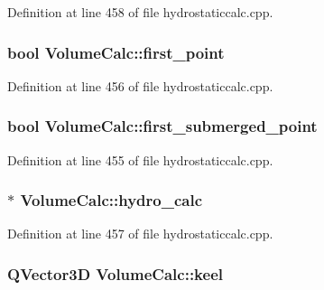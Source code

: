 Definition at line 458 of file hydrostaticcalc.\-cpp.

\hypertarget{structVolumeCalc_ab639da79639aeb33b3aaeb429283f8ca}{
\subsubsection[{first\-\_\-point}]{\setlength{\rightskip}{0pt plus 5cm}bool Volume\-Calc\-::first\-\_\-point}}\label{structVolumeCalc_ab639da79639aeb33b3aaeb429283f8ca}


Definition at line 456 of file hydrostaticcalc.\-cpp.

\hypertarget{structVolumeCalc_a3bc27914e09f86d93cb28daad90dddc1}{
\subsubsection[{first\-\_\-submerged\-\_\-point}]{\setlength{\rightskip}{0pt plus 5cm}bool Volume\-Calc\-::first\-\_\-submerged\-\_\-point}}\label{structVolumeCalc_a3bc27914e09f86d93cb28daad90dddc1}


Definition at line 455 of file hydrostaticcalc.\-cpp.

\hypertarget{structVolumeCalc_a5b3b6d4983faa3c309ddc85981945993}{
\subsubsection[{hydro\-\_\-calc}]{$\ast$ Volume\-Calc\-::hydro\-\_\-calc}}\label{structVolumeCalc_a5b3b6d4983faa3c309ddc85981945993}


Definition at line 457 of file hydrostaticcalc.\-cpp.

\hypertarget{structVolumeCalc_a07e433d13508d3342e7f6a50604c40d3}{
\subsubsection[{keel}]{\setlength{\rightskip}{0pt plus 5cm}Q\-Vector3\-D Volume\-Calc\-::keel}}\label{structVolumeCalc_a07e433d13508d3342e7f6a50604c40d3}



